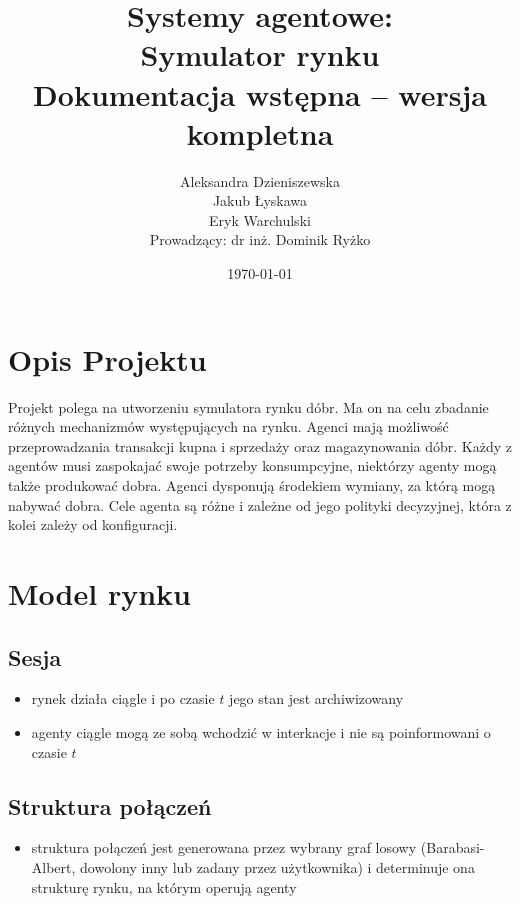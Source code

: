 \documentclass[]{article}
\date{}
\title{Systemy agentowe: \\ Symulator rynku \\ Dokumentacja wstępna -- wersja kompletna}
\author{Aleksandra Dzieniszewska \\ Jakub Łyskawa \\ Eryk Warchulski \\ Prowadzący: dr inż. Dominik Ryżko}%
\date{\today}
\providecommand{\tightlist}{%
  \setlength{\itemsep}{0pt}\setlength{\parskip}{0pt}}
\begin{document}
\maketitle
\hypertarget{opis-projektu}{%
\section{Opis Projektu}\label{opis-projektu}}

Projekt polega na utworzeniu symulatora rynku dóbr. Ma on na celu
zbadanie różnych mechanizmów występujących na rynku. Agenci mają
możliwość przeprowadzania transakcji kupna i sprzedaży oraz
magazynowania dóbr. Każdy z agentów musi zaspokajać swoje potrzeby
konsumpcyjne, niektórzy agenty mogą także produkować dobra. Agenci
dysponują środekiem wymiany, za którą mogą nabywać dobra. Cele agenta są
różne i zależne od jego polityki decyzyjnej, która z kolei zależy od
konfiguracji.

\hypertarget{model-rynku}{%
\section{Model rynku}\label{model-rynku}}

\hypertarget{sesja}{%
\subsection{Sesja}\label{sesja}}

\begin{itemize}
\tightlist
\item
  rynek działa ciągle i po czasie \(t\) jego stan jest archiwizowany
\item
  agenty ciągle mogą ze sobą wchodzić w interkacje i nie są
  poinformowani o czasie \(t\)
\end{itemize}

\hypertarget{struktura-poux142ux105czeux144}{%
\subsection{Struktura połączeń}\label{struktura-poux142ux105czeux144}}

\begin{itemize}
\tightlist
\item
  struktura połączeń jest generowana przez wybrany graf losowy
  (Barabasi-Albert, dowolony inny lub zadany przez użytkownika) i
  determinuje ona strukturę rynku, na którym operują agenty
\end{itemize}
\end{document}
